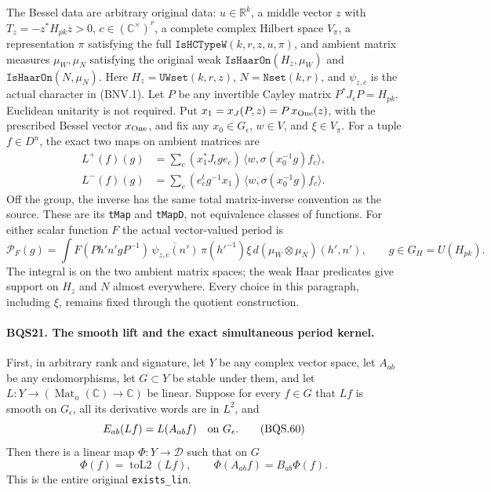 The Bessel data are arbitrary original data:
$u\in\mathbb R^k$, a middle vector $z$ with $T_z=-z^*H_{pk}z>0$,
$c\in(\mathbb C^\times)^r$, a complete complex Hilbert space $V_\pi$,
a representation $\pi$ satisfying the full
$\texttt{IsHCTypeW}(k,r,z,u,\pi)$, and ambient matrix measures
$\mu_W,\mu_N$ satisfying the original weak
$\texttt{IsHaarOn}(H_z,\mu_W)$ and
$\texttt{IsHaarOn}(N,\mu_N)$.
Here $H_z=\texttt{UWset}(k,r,z)$, $N=\texttt{Nset}(k,r)$,
and $\psi_{z,c}$ is the actual character in (BNV.1).
Let $P$ be any invertible Cayley matrix
$P^*J_\epsilon P=H_{pk}$.  Euclidean unitarity is not required.
Put $x_1=x_J(P,z)=P\,x_{\rm One}(z)$, with the prescribed Bessel
vector $x_{\rm One}$, and fix any
$x_0\in G_\epsilon$, $w\in V$, and $\xi\in V_\pi$.
For a tuple $f\in D^n$, the exact two maps on ambient matrices are
\[
 \begin{split}
 L^+(f)(g)&=\sum_c
  (x_1^*J_\epsilon ge_c)\,
       \langle w,\sigma(x_0^{-1}g)f_c\rangle,\\
 L^-(f)(g)&=\sum_c
  (e_c^t g^{-1}x_1)\,
       \langle w,\sigma(x_0^{-1}g)f_c\rangle .
 \end{split}
 \tag{BQS.58}
\]
Off the group, the inverse has the same total matrix-inverse convention
as the source.  These are its \texttt{tMap} and \texttt{tMapD},
not equivalence classes of functions.
For either scalar function $F$ the actual vector-valued period is
\[
 \mathcal P_F(g)=
 \int F(P h' n' gP^{-1})\,
       \overline{\psi_{z,c}(n')}\,\pi(h'^{-1})\xi\,
             d(\mu_W\otimes\mu_N)(h',n'),\qquad g\in G_H=U(H_{pk}).
 \tag{BQS.59}
\]
The integral is on the two ambient matrix spaces; the weak Haar
predicates give support on $H_z$ and $N$ almost everywhere.
Every choice in this paragraph, including $\xi$, remains fixed
through the quotient construction.

\paragraph{BQS21. The smooth lift and the exact simultaneous period kernel.}
\label{claim:BQS21}
First, in arbitrary rank and signature, let $Y$ be any complex vector
space, let $A_{ab}$ be any endomorphisms, let $G\subset Y$ be stable
under them, and let $L:Y\to(\operatorname{Mat}_n(\mathbb C)\to\mathbb C)$
be linear.
Suppose for every $f\in G$ that $Lf$ is smooth on $G_\epsilon$,
all its derivative words are in $L^2$, and
\[
                   E_{ab}(Lf)=L(A_{ab}f)\quad\hbox{on }G_\epsilon.
 \tag{BQS.60}
\]
Then there is a linear map $\Phi:Y\to\mathcal D$ such that on $G$
\[
        \Phi(f)=\operatorname{toL2}(Lf),\qquad
        \Phi(A_{ab}f)=B_{ab}\Phi(f).
 \tag{BQS.61}
\]
This is the entire original \texttt{exists\_lin}.


